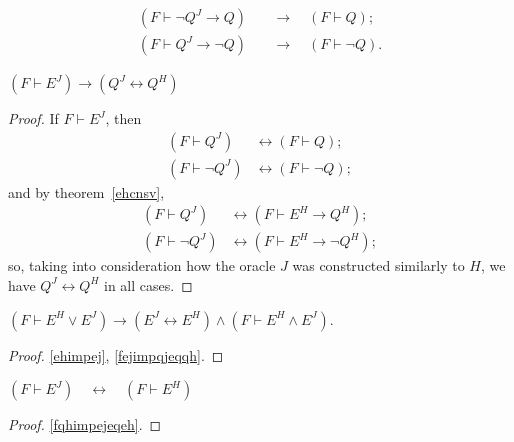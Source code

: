 \documentclass[letterpaper]{article}
\newcommand{\Theorem}{\raisebox{0.5ex}{\large\Beam}}
\newcommand{\Corollary}{\CircPipe}
\begin{document}
\begin{remark}
\begin{align}
(F\vdash \lnot Q^J\longrightarrow Q)\quad
&\longrightarrow\quad(F\vdash Q);\\
(F\vdash Q^J\longrightarrow\lnot Q)\quad
&\longrightarrow\quad(F\vdash\lnot Q).
\end{align}
\end{remark}
\begin{theorem}\label{fejimpqjeqqh}
	$(F\vdash E^J)\longrightarrow(Q^J\longleftrightarrow Q^H)$
\end{theorem}
\begin{proof}
	If $F\vdash E^J$, then
	\begin{align}
		(F\vdash Q^J)&\longleftrightarrow(F\vdash Q);\\
		(F\vdash\lnot Q^J)&\longleftrightarrow(F\vdash\lnot Q);
	\end{align}
	and by theorem~\ref{ehcnsv},
	\begin{align}
		(F\vdash Q^J)&\longleftrightarrow(F\vdash E^H\longrightarrow Q^H);\\
		(F\vdash\lnot Q^J)&\longleftrightarrow(F\vdash E^H\longrightarrow\lnot Q^H);
	\end{align}
	so, taking into consideration how the oracle $J$ was constructed similarly to $H$, we have $Q^J\longleftrightarrow Q^H$ in all cases. 
\end{proof}
\begin{corollary}\label{fqhimpejeqeh}
	$(F\vdash E^H\lor E^J)\longrightarrow (E^J\longleftrightarrow E^H)\land(F\vdash E^H\land E^J)$.
\end{corollary}
\begin{proof}
	\Theorem \ref{ehimpej}, \Theorem\ref{fejimpqjeqqh}.
\end{proof}
\begin{corollary}\label{ejeqeh}
	$(F\vdash E^J)\quad\longleftrightarrow\quad(F\vdash E^H)$
\end{corollary}
\begin{proof}
	\Corollary \ref{fqhimpejeqeh}.
\end{proof}
\end{document}
